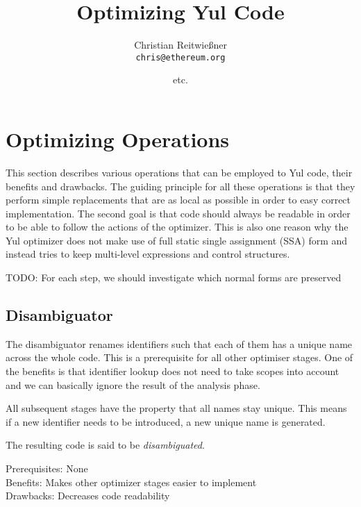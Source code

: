 \documentclass[11pt,letterpaper]{article}
\date{}
\begin{document}


\title{Optimizing Yul Code}

\author{Christian Reitwießner \\ 
{\tt chris@ethereum.org} \and etc.}


\maketitle



\section{Optimizing Operations}

This section describes various operations that
can be employed to Yul code, their benefits and drawbacks.
The guiding principle for all these operations is that they
perform simple replacements that are as local as possible
in order to easy correct implementation. The second goal
is that code should always be readable in order to be
able to follow the actions of the optimizer. This is also
one reason why the Yul optimizer does not make use of
full static single assignment (SSA) form and instead
tries to keep multi-level expressions and control structures.

TODO: For each step, we should investigate which normal forms are preserved

\subsection{Disambiguator}

The disambiguator renames identifiers such that each of them has a unique name
across the whole code. This is a prerequisite for all other optimiser stages.
One of the benefits is that identifier lookup does not need to take scopes into account
and we can basically ignore the result of the analysis phase.

All subsequent stages have the property that all names stay unique. This means if
a new identifier needs to be introduced, a new unique name is generated.

The resulting code is said to be \emph{disambiguated}.

Prerequisites: None\\
Benefits: Makes other optimizer stages easier to implement\\
Drawbacks: Decreases code readability
\end{document}
